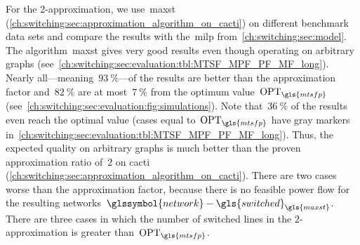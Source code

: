 For the 2-approximation, we use~\gls{maxst}
(\cref{ch:switching:sec:approximation_algorithm_on_cacti}) on different
benchmark data sets and compare the results with the~\gls{milp}
from~\cref{ch:switching:sec:model}. The algorithm~\gls{maxst} gives very good
results even though operating on arbitrary graphs
(see~\cref{ch:switching:sec:evaluation:tbl:MTSF_MPF_PF_MF_long}). Nearly
all---meaning~$93~\%$---of the results are better than the approximation factor
and~$82~\%$ are at most~$7~\%$ from the optimum value~$\opt_{\gls{mtsfp}}$
(see~\cref{ch:switching:sec:evaluation:fig:simulations}). Note
that~$36~\%$ of the results even reach the optimal value (cases equal
to~$\opt_{\gls{mtsfp}}$ have gray markers
in~\cref{ch:switching:sec:evaluation:tbl:MTSF_MPF_PF_MF_long}). Thus, the
expected quality on arbitrary graphs is much better than the proven
approximation ratio of~$2$ on cacti
(\cref{ch:switching:sec:approximation_algorithm_on_cacti}). There are two cases
worse than the approximation factor, because there is no feasible power flow for
the resulting networks~$\glssymbol{network}-\gls{switched}_{\gls{maxst}}$. There
are three cases in which the number of switched lines in the $2$-approximation
is greater than~$\opt_{\gls{mtsfp}}$. %

